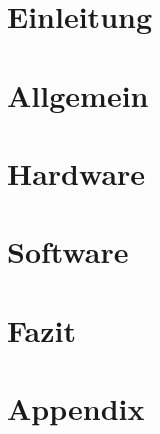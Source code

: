 \cleardoublepage
\tableofcontents

\cleardoublepage
\chapter{Einleitung}


\chapter{Allgemein}


\chapter{Hardware}


\chapter{Software}


\chapter{Fazit}


\chapter{Appendix}
